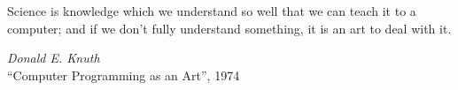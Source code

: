 \begin{epigrafe}

\hypertarget{estilo:epigrafe}{}

{
\centering
\epigraph{\large Science is knowledge which we understand so well that we can teach it to a computer; and if we don't fully understand something, it is an art to deal with it.}{\textit{\large Donald E. Knuth} \\ ``Computer Programming as an Art'', 1974}
}

\end{epigrafe}

